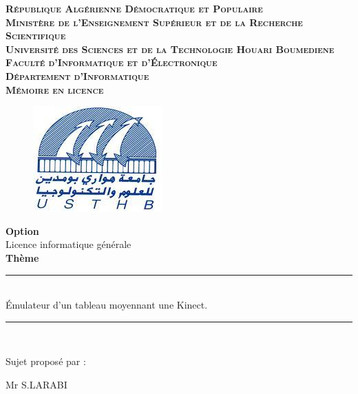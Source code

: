 \documentclass[12pt,a4paper,oneside]{book}
\newcommand{\HRule}{\rule{\linewidth}{0.5mm}}
\begin{document}
	\begin{titlepage}
	
		\begin{center}
			\textsc{\Large \textbf{République Algérienne Démocratique et Populaire}\\[.20cm]
				\Large\textbf{ Ministère de l’Enseignement Supérieur et de la Recherche Scientifique} \\[.20cm]
				\Large \textbf{Université des Sciences et de la Technologie Houari Boumediene \\[.25cm]
					Faculté d'Informatique et d'Électronique \\[.25cm] 
					Département d'Informatique \\ Mémoire en licence }}
			\begin{figure}[h]
				\centering
				\includegraphics[scale=0.7]{images/USTHB.jpg}
			\end{figure}
			
			\Large \textbf{Option}\\ Licence informatique générale \\ \Large\textbf{Thème}
			
			\HRule \\[0.4cm]
			{ \huge \bfseries  }
			\LARGE Émulateur d'un tableau moyennant une Kinect. 
			\HRule \\[1.5cm]
		
			\begin{minipage}{0.5\textwidth}
				\begin{flushleft}
					Sujet proposé par :\\
					
					
					
				\end{flushleft}
				\begin{flushleft}\large
					Mr S.LARABI\\
				\end{flushleft}
				

\end{minipage}
\end{center}
\end{titlepage}
\end{document}
